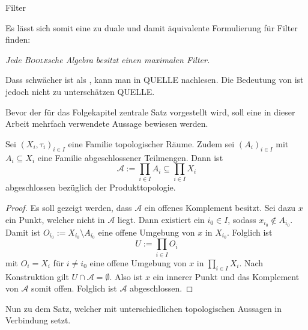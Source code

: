 \begin{defn}
  Filter
\end{defn}

Es lässt sich somit eine zu \PIT duale und damit äquivalente Formulierung für Filter finden:
  \begin{addmargin}[2em]{2em}%
    \textit{Jede \textsc{Boole}sche Algebra besitzt einen maximalen Filter.}
  \end{addmargin}

Dass \PIT schwächer ist als \AC, kann man in QUELLE nachlesen.
Die Bedeutung von \PIT ist jedoch nicht zu unterschätzen QUELLE.

Bevor der für das Folgekapitel zentrale Satz vorgestellt wird, soll eine in dieser Arbeit mehrfach verwendete Aussage bewiesen werden.

\begin{prop}
  \label{prop:cartesianclosed}
  Sei $(X_i,\tau_i)_{i \in I}$ eine Familie topologischer Räume. 
  Zudem sei $(A_i)_{i \in I}$ mit  $A_i \subseteq X_i$ eine Familie abgeschlossener Teilmengen.
  Dann ist 
  \begin{displaymath}
    \mathcal{A} := \prod_{i \in I} A_i \subseteq \prod_{i \in I} X_i
  \end{displaymath}
  abgeschlossen bezüglich der Produkttopologie.
\end{prop}

\begin{proof}
  Es soll gezeigt werden, dass $\mathcal{A}$ ein offenes Komplement besitzt.
  Sei dazu $x$ ein Punkt, welcher nicht in $\mathcal{A}$ liegt.
  Dann existiert ein $i_0 \in I$, sodass $x_{i_0} \not\in A_{i_0}$.
  Damit ist $O_{i_0} := X_{i_0} \setminus A_{i_0}$ eine offene Umgebung von $x$ in $X_{i_0}$.
  Folglich ist
  \begin{displaymath}
    U:= \prod_{i \in I} O_i
  \end{displaymath}
  mit $O_i = X_i$ für $i \not= i_0$ eine offene Umgebung von $x$ in $\prod_{i \in I} X_i$.
  Nach Konstruktion gilt $U \cap \mathcal{A} = \emptyset$.
  Also ist $x$ ein innerer Punkt und das Komplement von $\mathcal{A}$ somit offen.
  Folglich ist $\mathcal{A}$ abgeschlossen.
\end{proof}

Nun zu dem Satz, welcher \PIT mit unterschiedlichen topologischen Aussagen in Verbindung setzt.

